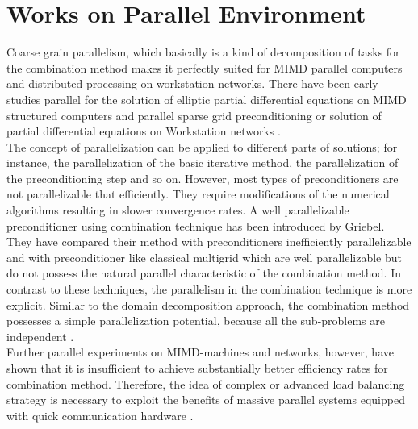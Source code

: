 \section{Works on Parallel Environment}
Coarse grain parallelism, which basically is a kind of decomposition of tasks for the combination method makes it perfectly suited for MIMD parallel computers and distributed processing on workstation networks. There have been early studies parallel for the solution of elliptic partial differential equations on MIMD structured computers and parallel sparse grid preconditioning or solution of partial differential equations on Workstation networks \cite{Griebel1992, Griebel1992a}.\\

The concept of parallelization can be applied to different parts of solutions; for instance, the parallelization of the basic iterative method, the parallelization of the preconditioning step and so on. However, most types of preconditioners are not parallelizable that efficiently. They require modifications of the numerical algorithms resulting in slower convergence rates. A well parallelizable preconditioner using combination technique has been introduced by Griebel. They have compared their method with preconditioners inefficiently parallelizable and with preconditioner like classical multigrid which are well parallelizable but do not possess the natural parallel characteristic of the combination method. In contrast to these techniques, the parallelism in the combination technique is more explicit. Similar to the domain decomposition approach, the combination method possesses a simple parallelization potential, because all the sub-problems are independent \cite{Griebel1992}.\\

Further parallel experiments on MIMD-machines and networks, however, have shown that it is insufficient to achieve substantially better efficiency rates for combination method. Therefore, the idea of complex or advanced load balancing strategy is necessary to exploit the benefits of massive parallel systems equipped with quick communication hardware \cite{Griebel1992}. \\

